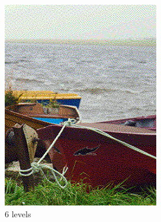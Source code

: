 \documentclass[]{article}
\begin{document}
\begin{figure}[!htbp]
\begin{minipage}[b]{0.4\textwidth}
		\includegraphics[width=\textwidth]{img/dithering6}
		\caption{6 levels}
	\end{minipage}
\end{figure}
\end{document}
